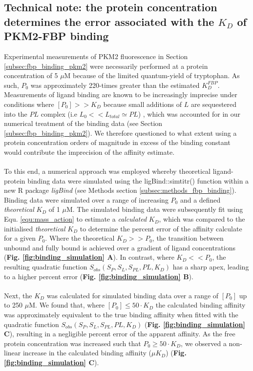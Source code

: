 \subsection{Technical note: the protein concentration determines the error associated with the $K_D$ of PKM2-FBP binding}
Experimental measurements of PKM2 fluorescence in Section \ref{subsec:fbp_binding_pkm2} were necessarily performed at a protein concentration of 5 $\mu$M because of the limited quantum-yield of tryptophan. As such, $P_0$ was approximately 220-times greater than the estimated $K_D^{FBP}$. Measurements of ligand binding are known to be increasingly imprecise under conditions where $[P_{0}] >> K_{D}$ because small additions of $L$ are sequestered into the $PL$ complex (i.e $L_{0} << L_{total} \simeq PL$) \cite{Hulme:2010aa,Pollard:2010aa}, which was accounted for in our numerical treatment of the binding data (see Section \ref{subsec:fbp_binding_pkm2}). We therefore questioned to what extent using a protein concentration orders of magnitude in excess of the binding constant would contribute the imprecision of the affinity estimate.
%
\\\\
%
To this end, a numerical approach was employed whereby theoretical ligand-protein binding data were simulated using the ligBind::simtitr() function within a new R package \textit{ligBind} (see Methods section \ref{subsec:methods_fbp_binding}). Binding data were simulated over a range of increasing $P_{0}$ and a defined \textit{theoretical} $K_D$ of 1 $\mu$M. The simulated binding data were subsequently fit using Equ. \ref{equ:mass_action} to estimate a \textit{calculated} $K_D$, which was compared to the initialised \textit{theoretical} $K_D$ to determine the percent error of the affinity calculate for a given $P_0$. Where the theoretical $K_{D} >> P_{0}$, the transition between unbound and fully bound is achieved over a gradient of ligand concentrations (\textbf{Fig. \ref{fig:binding_simulation} A}). In contrast, where $K_{D} << P_{0}$, the resulting quadratic function $S_{obs}(S_{P}, S_{L}, S_{PL}, PL, K_{D})$ has a sharp apex, leading to a higher percent error (\textbf{Fig. \ref{fig:binding_simulation} B}).
%
%
\\\\
%
%
Next, the $K_D$ was calculated for simulated binding data over a range of $[P_{0}]$ up to 250 $\mu$M. We found that, where $[P_0] \le 50 \cdot K_{D}$ the calculated binding affinity was approximately equivalent to the true binding affinity when fitted with the quadratic function $S_{obs}(S_{P}, S_{L}, S_{PL}, PL, K_{D})$ (\textbf{Fig. \ref{fig:binding_simulation} C}), resulting in a negligible percent error of the apparent affinity. As the free protein concentration was increased such that $P_0 \ge 50 \cdot K_{D}$, we observed a non-linear increase in the calculated binding affinity ($\mu K_D$) (\textbf{Fig. \ref{fig:binding_simulation} C}). 

